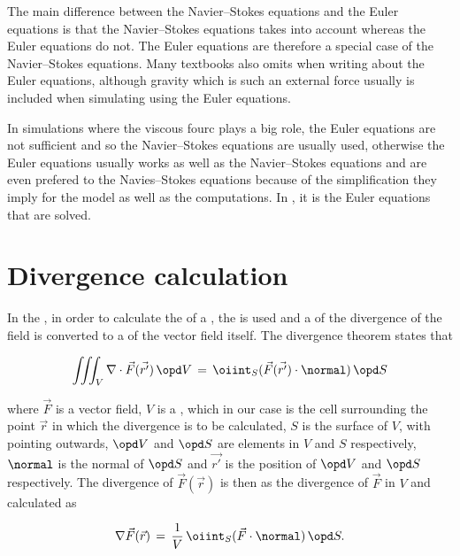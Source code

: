 The main difference between the Navier--Stokes equations and the Euler equations is that the Navier--Stokes equations takes  into account whe\-reas the Euler equations do not. The Euler equations are therefore a special case of the Navier--Stokes equations. Many textbooks also omits  when writing about the Euler equations, although gravity which is such an external force usually is included when simulating  using the Euler equations.

In simulations where the viscous fourc plays a big role, the Euler equations are not sufficient and so the Navier--Stokes equations are usually used, otherwise the Euler equations usually works as well as the Navier--Stokes equations and are even prefered to the Navies--Stokes equations because of the simplification they imply for the model as well as the computations. In \thisprojectwork, it is the Euler equations that are solved.

\section{Divergence calculation}

In the \PDEs, in order to calculate the \divergence of a , the  is used and a  of the divergence of the field is converted to a  of the vector field itself. The divergence theorem states that

\begin{equation} \label{eq:divergence_theorem}
\iiint_V\nabla\cdot\vec{F}(\vec{r'})\,\opd V \,=\, \oiint_S(\vec{F}(\vec{r'})\cdot\normal)\,\opd S
\end{equation}

where $\vec{F}$ is a vector field, $V$ is a , which in our case is the cell surrounding the point $\vec{r}$ in which the divergence is to be calculated, $S$ is the surface of $V$, with  pointing outwards, $\opd V$ and $\opd S$ are \infinitesimal elements in $V$ and $S$ respectively, $\normal$ is the normal of $\opd S$ and $\vec{r'}$ is the position of $\opd V$ and $\opd S$ respectively. The divergence of $\vec{F}(\vec{r})$ is then \approximated as the \average divergence of $\vec{F}$ in $V$ and calculated as

\begin{equation} \label{eq:divergence_surface_integral}
\nabla\vec{F}(\vec{r}) \,=\, \frac{1}{V}\,\oiint_S(\vec{F}\cdot\normal)\,\opd S.
\end{equation}

